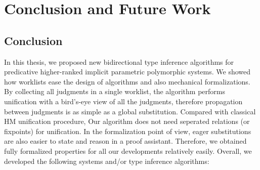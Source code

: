 \chapter{Conclusion and Future Work}
\label{chap:conclusion}


\section{Conclusion}

In this thesis, we proposed new bidirectional type inference algorithms for
predicative higher-ranked implicit parametric polymorphic systems.
We showed how worklists ease the design of algorithms
and also mechanical formalizations.
By collecting all judgments in a single worklist,
the algorithm performs unification with a bird's-eye view of all the judgments,
therefore propagation between judgments is as simple as a global substitution.
Compared with classical HM unification procedure,
Our algorithm does not need seperated relations (or fixpoints) for unification.
In the formalization point of view,
eager substitutions are also easier to state and reason in a proof assistant.
Therefore, we obtained fully formalized properties for all our developments
relatively easily.
Overall, we developed the following systems and/or type inference algorithms:


